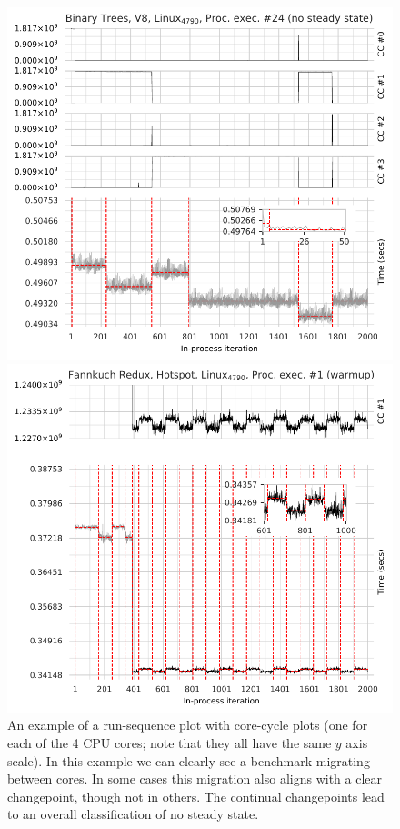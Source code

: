 \documentclass[acmsmall,screen]{acmart}
\begin{document}
\begin{figure}[t]
\centering
\begin{minipage}[t]{0.485\textwidth}
\includegraphics[width=\textwidth]{examples/new_no_steady.pdf}
\caption{An example of a run-sequence plot with core-cycle plots (one
for each of the 4 CPU cores; note that they all have the same $y$ axis scale). In this
example we can clearly see a benchmark migrating between cores. In some
cases this migration also aligns with a clear changepoint, though not
in others. The continual changepoints lead to an overall classification
of no steady state.}
\label{fig:examples:nosteadystate}
\end{minipage}%
\hfill%
\begin{minipage}[t]{0.485\textwidth}
\includegraphics[width=\textwidth]{examples/new_cyclic.pdf}

\end{minipage}
\end{figure}
\end{document}
